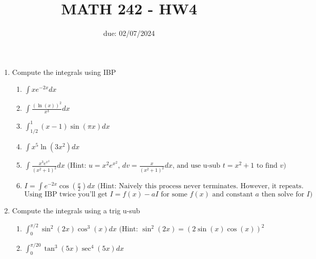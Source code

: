 \documentclass[12pt]{article}
\title{MATH 242 - HW4}
\date{due: 02/07/2024}
\begin{document}
\maketitle


\begin{enumerate}

\item Compute the integrals using IBP
\begin{enumerate}
    \item $\int xe^{-2x}dx$
    \vfill
    \item $\int\frac{(\ln({x}))^2}{x^3}dx$
    \vfill
    \newpage
    \item $\int_{1/2}^{1}(x-1)\sin(\pi x)dx$
    \vfill
    \item $\int x^5\ln(3x^2)dx$
    \vfill
    \newpage
    \item $\int\frac{x^3e^{x^2}}{(x^2+1)^2}dx\text{ (Hint: }u=x^2e^{x^2}\text{, }dv=\frac{x}{(x^2+1)^2}dx\text{, and use u-sub }t=x^2+1 \text{ to find }v)$
    \vfill
    \item $I=\int e^{-2x}\cos(\frac{x}{2})dx\text{ (Hint: Naively this process never terminates. However, it repeats.}$ $\text{Using IBP twice you'll get }I=f(x)-aI\text{ for some }f(x)\text{ and constant }a\text{ then solve for } I)$
    \vfill
\end{enumerate}
\newpage
\item Compute the integrals using a trig u-sub
\begin{enumerate}
    \item $\int_0^{\pi/2}\sin^{2}(2x)\cos^3(x)dx\text{ (Hint: }\sin^2(2x)=(2\sin(x)\cos(x))^2$
    \vfill
    \item $\int_0^{\pi/20}\tan^3(5x)\sec^4(5x)dx$
    \vfill
\end{enumerate}
\end{enumerate}
\end{document}
